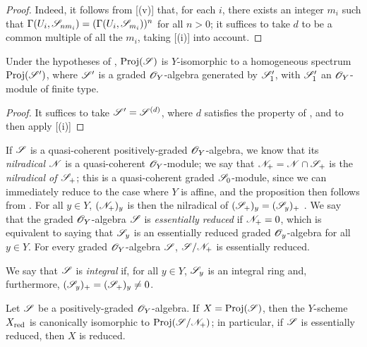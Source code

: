 \begin{proof}
Indeed, it follows from [(v)] that, for each $i$, there exists an integer $m_i$ such that $\Gamma(U_i,\mathscr{S}_{nm_i})=(\Gamma(U_i,\mathscr{S}_{m_i}))^n$ for all $n>0$;
it suffices to take $d$ to be a common multiple of all the $m_i$, taking [(i)] into account.
\end{proof}

\begin{corollary}[3.1.11]
\label{II.3.1.11}
Under the hypotheses of , ${\mathop{\mathrm{Proj}}\nolimits}(\mathscr{S})$ is $Y$-isomorphic to a homogeneous spectrum ${\mathop{\mathrm{Proj}}\nolimits}(\mathscr{S}')$, where $\mathscr{S}'$ is a graded $\mathscr{O}_Y$-algebra generated by $\mathscr{S}'_1$, with $\mathscr{S}'_1$ an $\mathscr{O}_Y$-module of finite type.
\end{corollary}

\begin{proof}
It suffices to take $\mathscr{S}'=\mathscr{S}^{(d)}$, where $d$ satisfies the property of , and to then apply [(i)]
\end{proof}

\begin{env}[3.1.12]
\label{II.3.1.12}
If $\mathscr{S}$ is a quasi-coherent positively-graded $\mathscr{O}_Y$-algebra, we know  that its \emph{nilradical} $\mathscr{N}$ is a quasi-coherent $\mathscr{O}_Y$-module;
we say that $\mathscr{N}_+=\mathscr{N}\cap\mathscr{S}_+$ is the \emph{nilradical of $\mathscr{S}_+$};
this is a quasi-coherent graded $\mathscr{S}_0$-module, since we can immediately reduce to the case where $Y$ is affine, and the proposition then follows from .
For all $y\in Y$, $(\mathscr{N}_+)_y$ is then the nilradical of $(\mathscr{S}_+)_y=(\mathscr{S}_y)_+$ .
We say that the graded $\mathscr{O}_Y$-algebra $\mathscr{S}$ is \emph{essentially reduced} if $\mathscr{N}_+=0$, which is equivalent
to saying that $\mathscr{S}_y$ is an essentially reduced graded $\mathscr{O}_y$-algebra for all $y\in Y$.
For every graded $\mathscr{O}_Y$-algebra $\mathscr{S}$, $\mathscr{S}/\mathscr{N}_+$ is essentially reduced.

We say that $\mathscr{S}$ is \emph{integral} if, for all $y\in Y$, $\mathscr{S}_y$ is an integral ring and, furthermore, $(\mathscr{S}_y)_+=(\mathscr{S}_+)_y\neq0$.
\end{env}

\begin{proposition}[3.1.13]
\label{II.3.1.13}
Let $\mathscr{S}$ be a positively-graded $\mathscr{O}_Y$-algebra.
If $X={\mathop{\mathrm{Proj}}\nolimits}(\mathscr{S})$, then the $Y$-scheme $X_{\mathrm{red}}$ is canonically isomorphic to ${\mathop{\mathrm{Proj}}\nolimits}(\mathscr{S}/\mathscr{N}_+)$;
in particular, if $\mathscr{S}$ is essentially reduced, then $X$ is reduced.
\end{proposition}

